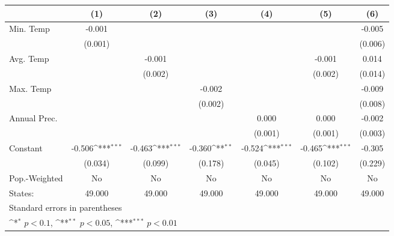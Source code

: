 {
\def\sym#1{\ifmmode^{#1}\else\(^{#1}\)\fi}
\begin{tabular}{l*{6}{c}}
\hline\hline
            &\multicolumn{1}{c}{(1)}         &\multicolumn{1}{c}{(2)}         &\multicolumn{1}{c}{(3)}         &\multicolumn{1}{c}{(4)}         &\multicolumn{1}{c}{(5)}         &\multicolumn{1}{c}{(6)}         \\
\hline
Min. Temp   &      -0.001         &                     &                     &                     &                     &      -0.005         \\
            &     (0.001)         &                     &                     &                     &                     &     (0.006)         \\
[1em]
Avg. Temp   &                     &      -0.001         &                     &                     &      -0.001         &       0.014         \\
            &                     &     (0.002)         &                     &                     &     (0.002)         &     (0.014)         \\
[1em]
Max. Temp   &                     &                     &      -0.002         &                     &                     &      -0.009         \\
            &                     &                     &     (0.002)         &                     &                     &     (0.008)         \\
[1em]
Annual Prec.&                     &                     &                     &       0.000         &       0.000         &      -0.002         \\
            &                     &                     &                     &     (0.001)         &     (0.001)         &     (0.003)         \\
[1em]
Constant    &      -0.506\sym{***}&      -0.463\sym{***}&      -0.360\sym{**} &      -0.524\sym{***}&      -0.465\sym{***}&      -0.305         \\
            &     (0.034)         &     (0.099)         &     (0.178)         &     (0.045)         &     (0.102)         &     (0.229)         \\
\hline
Pop.-Weighted&          No         &          No         &          No         &          No         &          No         &          No         \\
States:     &      49.000         &      49.000         &      49.000         &      49.000         &      49.000         &      49.000         \\
\hline\hline
\multicolumn{7}{l}{\footnotesize Standard errors in parentheses}\\
\multicolumn{7}{l}{\footnotesize \sym{*} \(p<0.1\), \sym{**} \(p<0.05\), \sym{***} \(p<0.01\)}\\
\end{tabular}
}
